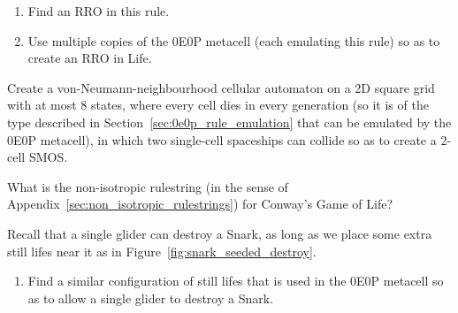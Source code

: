\begin{multicols}{2}
\begin{problem}
		\begin{enumerate}[label=\bf\color{ocre}(\alph*)]
			\item {} Find an RRO in this rule.
			
			\item {} Use multiple copies of the 0E0P metacell (each emulating this rule) so as to create an RRO in Life.
			
		\end{enumerate}
	\end{problem}


	\mfilbreak


	\begin{problem}\label{exer:0e0p_one_cell_smos} 
		Create a von-Neumann-neighbourhood cellular automaton on a 2D square grid with at most $8$ states, where every cell dies in every generation (so it is of the type described in Section~\ref{sec:0e0p_rule_emulation} that can be emulated by the 0E0P metacell), in which two single-cell spaceships can collide so as to create a $2$-cell SMOS.
		
	\end{problem}


	\mfilbreak
	
	
	\begin{problem}\label{exer:non_isotropic_rulestring_life} 
		What is the non-isotropic rulestring (in the sense of Appendix~\ref{sec:non_isotropic_rulestrings}) for Conway's Game of Life?
	\end{problem}
	
	
	\mfilbreak
	
	
	\begin{problemstar}\label{exer:0e0p_snark_destroyer} 
		Recall that a single glider can destroy a Snark, as long as we place some extra still lifes near it as in Figure~\ref{fig:snark_seeded_destroy}.\smallskip
		
		\begin{enumerate}[label=\bf\color{ocre}(\alph*)]
			\item Find a similar configuration of still lifes that is used in the 0E0P metacell so as to allow a single glider to destroy a Snark.
			

\end{enumerate}
\end{problemstar}
\end{multicols}
